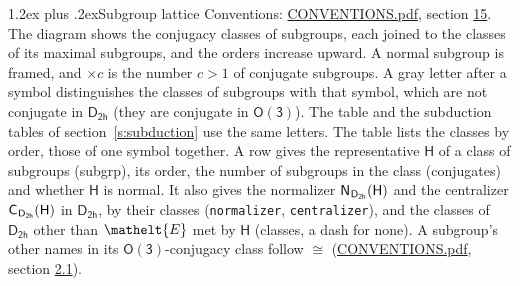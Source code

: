 \documentclass[10pt,a4paper]{article}
\makeatletter
\renewcommand\section{\@startsection{section}{1}{\z@}{-3ex plus -1ex minus -.2ex}%
  {1.2ex plus .2ex}{\normalfont\large\sffamily\bfseries\color{parttitle}}}
\numberwithin{equation}{section}
\newcommand{\eltfont}[1]{{\let\sigma\eltsigma\mathelt{#1}}}
\newcommand{\grp}[1]{\mathsf{#1}}
\newcommand{\cls}[1]{\eltfont{#1}}
\newcommand{\samecls}{\cong}
\newcommand{\hairsp}{\mkern1mu}
\makeatother
\begin{document}
\section{Subgroup lattice}\label{s:subgroups}
Conventions: \href{../../CONVENTIONS.pdf}{CONVENTIONS.pdf}, section \href{../../CONVENTIONS.pdf\#conv.15}{15}.
The diagram shows the conjugacy classes of subgroups, each joined to the classes of its maximal subgroups, and the orders increase upward. \label{n:index.conjugates.c}A normal subgroup is framed, and ${\times}c$ is the number $c > 1$ of conjugate subgroups. A gray letter after a symbol distinguishes the classes of subgroups with that symbol, which are not conjugate in $\grp{D_{2h}}$ (they are conjugate in \href{O3.pdf}{$\grp{O(3)}$}). The table and the subduction tables of section~\ref{s:subduction} use the same letters. The table lists the classes by order, those of one symbol together. \label{n:group.H}\label{n:head.subgroup}\label{n:head.order}\label{n:head.conjugates}\label{n:head.normal}A row gives the representative $\grp{H}$ of a class of subgroups (subgrp), its order, the number of subgroups in the class (conjugates) and whether $\grp{H}$ is normal. \label{n:group.normalizer}\label{n:group.centralizer}\label{n:head.classes}It also gives the normalizer $\grp{N}_{\hairsp \grp{D_{2h}}}(\grp{H})$ and the centralizer $\grp{C}_{\hairsp \grp{D_{2h}}}(\grp{H})$ in $\grp{D_{2h}}$, by their classes (\texttt{normalizer}, \texttt{centralizer}), and the classes of $\grp{D_{2h}}$ other than $\cls{E}$ met by $\grp{H}$ (classes, a dash for none). A subgroup's other names in its \href{O3.pdf}{$\grp{O(3)}$}-conjugacy class follow $\samecls$ (\href{../../CONVENTIONS.pdf}{CONVENTIONS.pdf}, section \href{../../CONVENTIONS.pdf\#conv.2.1}{2.1}).
\end{document}
